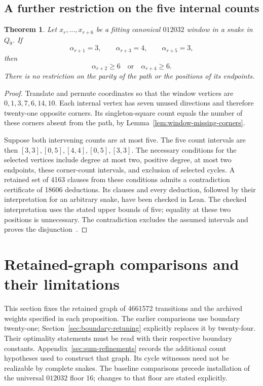 \documentclass[11pt,a4paper]{article}
\newtheorem{theorem}{Theorem}[section]
\theoremstyle{definition}
\theoremstyle{remark}
\newcommand{\Q}{Q}
\begin{document}
\subsection{A further restriction on the five internal counts}\label{sec:five-count-exclusion}
\begin{theorem}\label{thm:alternate-three-four-three}
Let $x_r,\ldots,x_{r+6}$ be a fitting canonical $012032$ window in a snake
in $\Q_9$. If
\[
\alpha_{r+1}=3,\qquad \alpha_{r+3}=4,\qquad \alpha_{r+5}=3,
\]
then
\[
\alpha_{r+2}\ge6\quad\text{or}\quad\alpha_{r+4}\ge6.
\]
There is no restriction on the parity of the path or the positions of its endpoints.
\end{theorem}
\begin{proof}
Translate and permute coordinates so that the window vertices are
$0,1,3,7,6,14,10$. Each internal vertex has seven unused directions and
therefore twenty-one opposite corners. Its singleton-square count equals
the number of these corners absent from the path, by
Lemma~\ref{lem:window-missing-corners}.

Suppose both intervening counts are at most five. The five count intervals
are then $[3,3],[0,5],[4,4],[0,5],[3,3]$. The necessary conditions for the
selected vertices include degree at most two, positive degree, at most two
endpoints, these corner-count intervals, and exclusion of selected cycles.
A retained set of 4163 clauses from these conditions admits a contradiction
certificate of 18606 deductions. Its clauses and every deduction, followed
by their interpretation for an arbitrary snake, have been checked in Lean.
The checked interpretation uses the stated upper bounds of five; equality
at these two positions is unnecessary. The contradiction excludes the
assumed intervals and proves the disjunction~\cite{fivecount140archive}.
\end{proof}

\section{Retained-graph comparisons and their limitations}\label{sec:current-limitations}
This section fixes the retained graph of 4661572 transitions and the
archived weights specified in each proposition. The earlier comparisons
use boundary twenty-one; Section~\ref{sec:boundary-retuning} explicitly
replaces it by twenty-four. Their optimality statements must be read with
their respective boundary constants.
Appendix~\ref{sec:sum-refinements} records the additional count hypotheses
used to construct that graph. Its cycle witnesses need not be realizable
by complete snakes. The baseline comparisons precede installation of the
universal $012032$ floor 16; changes to that floor are stated explicitly.
\end{document}
